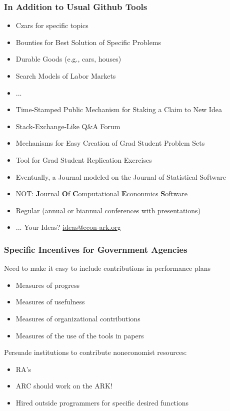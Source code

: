 \documentclass[public]{beamer}
\begin{document}
\begin{frame}
\frametitle{In Addition to Usual Github Tools}

\begin{itemize}
\item Czars for specific topics
\item Bounties for Best Solution of Specific Problems
\bi
\item Durable Goods (e.g., cars, houses)
\item Search Models of Labor Markets
\item ... 
\ei
\item Time-Stamped Public Mechanism for Staking a Claim to New Idea
\item Stack-Exchange-Like Q\&A Forum
\item Mechanisms for Easy Creation of Grad Student Problem Sets
\item Tool for Grad Student Replication Exercises
\item Eventually, a Journal modeled on the Journal of Statistical Software
\bi
\item NOT: {\bf J}ournal {\bf O}f {\bf C}omputational {\bf E}cononmics {\bf S}oftware
\ei
\item Regular (annual or biannual conferences with presentations)
\item ... Your Ideas?  \href{mailto:ideas@econ-ark.org}{ideas@econ-ark.org}
\end{itemize}

\end{frame}

\begin{frame}
\frametitle{Specific Incentives for Government Agencies}

Need to make it easy to include contributions in performance plans
\begin{itemize}
\item Measures of progress
\item Measures of usefulness
\item Measures of organizational contributions
\item Measures of the use of the tools in papers
\end{itemize}

\pause 
Persuade institutions to contribute noneconomist resources:
\begin{itemize}
\item RA's
\item ARC should work on the ARK!
\item Hired outside programmers for specific desired functions
\end{itemize}

\end{frame}
\end{document}
